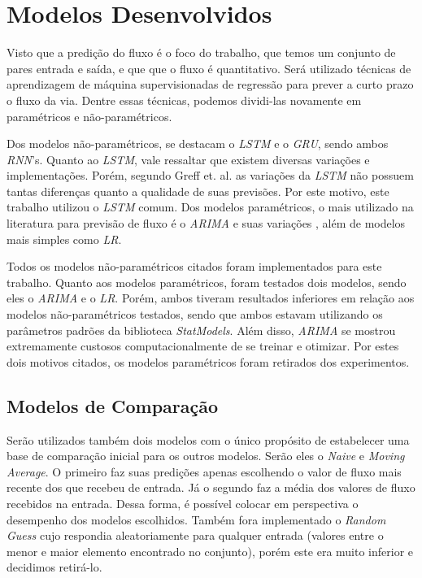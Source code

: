 \section{Modelos Desenvolvidos}

Visto que a predição do fluxo é o foco do trabalho, que temos um conjunto de pares entrada e saída, e que que o fluxo é quantitativo. Será utilizado técnicas de aprendizagem de máquina supervisionadas de regressão para prever a curto prazo o fluxo da via. Dentre essas técnicas, podemos dividi-las novamente em paramétricos e não-paramétricos.

Dos modelos não-paramétricos, se destacam o \textit{\acrfull{LSTM}} e o \textit{\acrfull{GRU}}, sendo ambos \textit{\acrshort{RNN}}'s. Quanto ao \textit{\acrfull{LSTM}}, vale ressaltar que existem diversas variações e implementações. Porém, segundo Greff et. al. \cite{Greff_2015} as variações da \textit{\acrshort{LSTM}} não possuem tantas diferenças quanto a qualidade de suas previsões. Por este motivo, este trabalho utilizou o \textit{\acrfull{LSTM}} comum. Dos modelos paramétricos, o mais utilizado na literatura para previsão de fluxo é o \textit{\acrfull{ARIMA}} e suas variações \cite{doi:10.1080/01441647.2014.992496}, além de modelos mais simples como \textit{\acrfull{LR}}. 


Todos os modelos não-paramétricos citados foram implementados para este trabalho. Quanto aos modelos paramétricos, foram testados dois modelos, sendo eles o \textit{\acrshort{ARIMA}} e o \textit{\acrshort{LR}}. Porém, ambos tiveram resultados inferiores em relação aos modelos não-paramétricos testados, sendo que ambos estavam utilizando os parâmetros padrões da biblioteca \textit{StatModels}. Além disso, \textit{\acrshort{ARIMA}} se mostrou extremamente custosos computacionalmente de se treinar e otimizar. Por estes dois motivos citados, os modelos paramétricos foram retirados dos experimentos.

\subsection{Modelos de Comparação}

Serão utilizados também dois modelos com o único propósito de estabelecer uma base de comparação inicial para os outros modelos. Serão eles o \textit{Naive} e \textit{Moving Average}. O primeiro faz suas predições apenas escolhendo o valor de fluxo mais recente dos que recebeu de entrada. Já o segundo faz a média dos valores de fluxo recebidos na entrada. Dessa forma, é possível colocar em perspectiva o desempenho dos modelos escolhidos. Também fora implementado o \textit{Random Guess} cujo respondia aleatoriamente para qualquer entrada (valores entre o menor e maior elemento encontrado no conjunto), porém este era muito inferior e decidimos retirá-lo.

